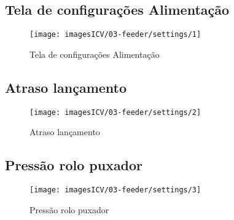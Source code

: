 \usepackage{graphicx}
\newpage
\thispagestyle{fancy}
\vspace{\fill}
\subsection{Tela de configurações Alimentação}

\begin{figure}
    \centering
    \texttt{[image: imagesICV/03-feeder/settings/1]}
    \caption{Tela de configurações Alimentação}
\end{figure}
\newpage
\thispagestyle{fancy}
\vspace{\fill}

\subsection{Atraso lançamento}
\begin{figure}
    \centering
    \texttt{[image: imagesICV/03-feeder/settings/2]}
    \caption{Atraso lançamento}
\end{figure}
\newpage
\thispagestyle{fancy}
\vspace{\fill}

\subsection{Pressão rolo puxador}
\begin{figure}
    \centering
    \texttt{[image: imagesICV/03-feeder/settings/3]}
    \caption{Pressão rolo puxador}
\end{figure}
